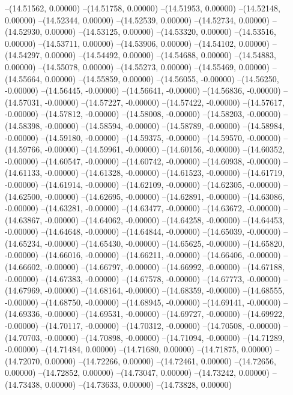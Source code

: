 --(14.51562, 0.00000)
--(14.51758, 0.00000)
--(14.51953, 0.00000)
--(14.52148, 0.00000)
--(14.52344, 0.00000)
--(14.52539, 0.00000)
--(14.52734, 0.00000)
--(14.52930, 0.00000)
--(14.53125, 0.00000)
--(14.53320, 0.00000)
--(14.53516, 0.00000)
--(14.53711, 0.00000)
--(14.53906, 0.00000)
--(14.54102, 0.00000)
--(14.54297, 0.00000)
--(14.54492, 0.00000)
--(14.54688, 0.00000)
--(14.54883, 0.00000)
--(14.55078, 0.00000)
--(14.55273, 0.00000)
--(14.55469, 0.00000)
--(14.55664, 0.00000)
--(14.55859, 0.00000)
--(14.56055, -0.00000)
--(14.56250, -0.00000)
--(14.56445, -0.00000)
--(14.56641, -0.00000)
--(14.56836, -0.00000)
--(14.57031, -0.00000)
--(14.57227, -0.00000)
--(14.57422, -0.00000)
--(14.57617, -0.00000)
--(14.57812, -0.00000)
--(14.58008, -0.00000)
--(14.58203, -0.00000)
--(14.58398, -0.00000)
--(14.58594, -0.00000)
--(14.58789, -0.00000)
--(14.58984, -0.00000)
--(14.59180, -0.00000)
--(14.59375, -0.00000)
--(14.59570, -0.00000)
--(14.59766, -0.00000)
--(14.59961, -0.00000)
--(14.60156, -0.00000)
--(14.60352, -0.00000)
--(14.60547, -0.00000)
--(14.60742, -0.00000)
--(14.60938, -0.00000)
--(14.61133, -0.00000)
--(14.61328, -0.00000)
--(14.61523, -0.00000)
--(14.61719, -0.00000)
--(14.61914, -0.00000)
--(14.62109, -0.00000)
--(14.62305, -0.00000)
--(14.62500, -0.00000)
--(14.62695, -0.00000)
--(14.62891, -0.00000)
--(14.63086, -0.00000)
--(14.63281, -0.00000)
--(14.63477, -0.00000)
--(14.63672, -0.00000)
--(14.63867, -0.00000)
--(14.64062, -0.00000)
--(14.64258, -0.00000)
--(14.64453, -0.00000)
--(14.64648, -0.00000)
--(14.64844, -0.00000)
--(14.65039, -0.00000)
--(14.65234, -0.00000)
--(14.65430, -0.00000)
--(14.65625, -0.00000)
--(14.65820, -0.00000)
--(14.66016, -0.00000)
--(14.66211, -0.00000)
--(14.66406, -0.00000)
--(14.66602, -0.00000)
--(14.66797, -0.00000)
--(14.66992, -0.00000)
--(14.67188, -0.00000)
--(14.67383, -0.00000)
--(14.67578, -0.00000)
--(14.67773, -0.00000)
--(14.67969, -0.00000)
--(14.68164, -0.00000)
--(14.68359, -0.00000)
--(14.68555, -0.00000)
--(14.68750, -0.00000)
--(14.68945, -0.00000)
--(14.69141, -0.00000)
--(14.69336, -0.00000)
--(14.69531, -0.00000)
--(14.69727, -0.00000)
--(14.69922, -0.00000)
--(14.70117, -0.00000)
--(14.70312, -0.00000)
--(14.70508, -0.00000)
--(14.70703, -0.00000)
--(14.70898, -0.00000)
--(14.71094, -0.00000)
--(14.71289, -0.00000)
--(14.71484, 0.00000)
--(14.71680, 0.00000)
--(14.71875, 0.00000)
--(14.72070, 0.00000)
--(14.72266, 0.00000)
--(14.72461, 0.00000)
--(14.72656, 0.00000)
--(14.72852, 0.00000)
--(14.73047, 0.00000)
--(14.73242, 0.00000)
--(14.73438, 0.00000)
--(14.73633, 0.00000)
--(14.73828, 0.00000)
